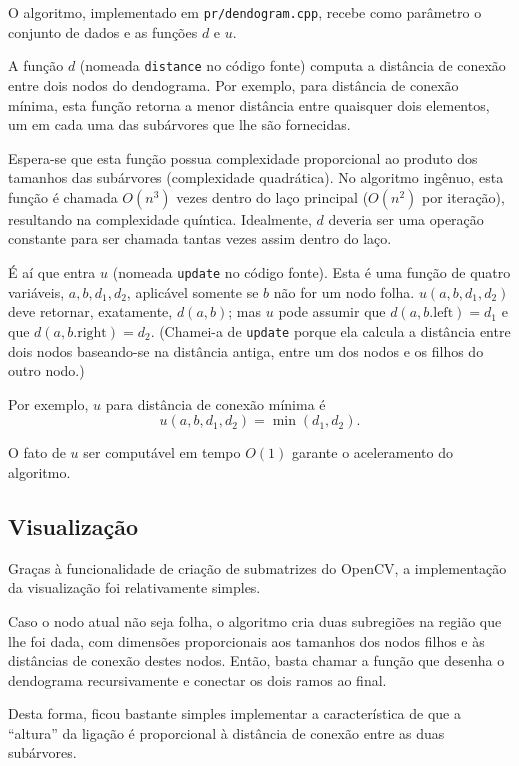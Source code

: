 \documentclass{article}
\begin{document}
O algoritmo, implementado em \verb"pr/dendogram.cpp",
recebe como parâmetro
o conjunto de dados e as funções $d$ e $u$.

A função $d$ (nomeada \verb"distance" no código fonte)
computa a distância de conexão entre dois nodos do dendograma.
Por exemplo, para distância de conexão mínima,
esta função retorna a menor distância entre quaisquer dois elementos,
um em cada uma das subárvores que lhe são fornecidas.

Espera-se que esta função possua complexidade proporcional
ao produto dos tamanhos das subárvores
(complexidade quadrática).
No algoritmo ingênuo, esta função é chamada $O(n^3)$ vezes
dentro do laço principal
($O(n^2)$ por iteração),
resultando na complexidade quíntica.
Idealmente, $d$ deveria ser uma operação constante
para ser chamada tantas vezes assim dentro do laço.

É aí que entra $u$ (nomeada \verb"update" no código fonte).
Esta é uma função de quatro variáveis,
$a, b, d_1, d_2$,
aplicável somente se $b$ não for um nodo folha.
$u(a, b, d_1, d_2)$ deve retornar, exatamente, $d(a, b)$;
mas $u$ pode assumir que $d(a, b.\textrm{left}) = d_1$
e que $d(a, b.\textrm{right}) = d_2$.
(Chamei-a de \verb"update" porque ela calcula a distância entre dois nodos
baseando-se na distância antiga, entre um dos nodos e os filhos do outro nodo.)

Por exemplo,
$u$ para distância de conexão mínima é
\begin{equation*}
    u( a, b, d_1, d_2 ) = \min(d_1, d_2).
\end{equation*}

O fato de $u$ ser computável em tempo $O(1)$
garante o aceleramento do algoritmo.

\subsection{Visualização}

Graças à funcionalidade de criação de submatrizes do OpenCV,
a implementação da visualização foi relativamente simples.

Caso o nodo atual não seja folha,
o algoritmo cria duas subregiões na região que lhe foi dada,
com dimensões proporcionais aos tamanhos dos nodos filhos
e às distâncias de conexão destes nodos.
Então, basta chamar a função que desenha o dendograma recursivamente
e conectar os dois ramos ao final.

Desta forma,
ficou bastante simples implementar a característica de que
a ``altura'' da ligação é proporcional à distância de conexão
entre as duas subárvores.
\end{document}
